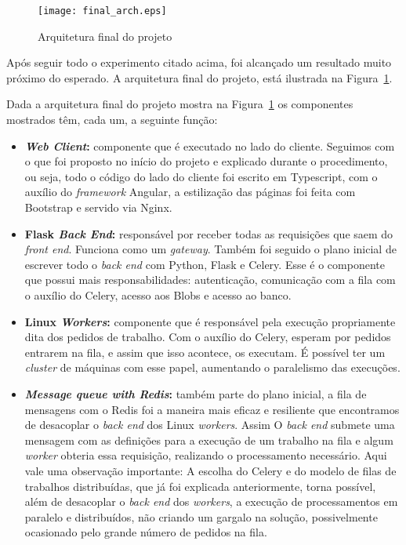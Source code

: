 \documentclass[11pt,twoside]{article}
\begin{document}
\begin{figure}[!h]
  \centering
  \texttt{[image: final\_arch.eps]}
  \caption{Arquitetura final do projeto}
  \label{fig:finalArch}
\end{figure}

Após seguir todo o experimento citado acima, foi alcançado um resultado muito próximo do esperado. A arquitetura final do projeto, está ilustrada na Figura~\ref{fig:finalArch}.

Dada a arquitetura final do projeto mostra na Figura~\ref{fig:finalArch} os componentes mostrados têm, cada um, a seguinte função:

\begin{itemize}
  \item \textbf{\emph{Web Client}:} componente que é executado no lado do cliente. Seguimos com o que foi proposto no início do projeto e explicado durante o procedimento, ou seja, todo o código do lado do cliente 
  foi escrito em Typescript, com o auxílio do \emph{framework} Angular, a estilização das páginas foi feita com Bootstrap e servido via Nginx.
  \item \textbf{Flask \emph{Back End}:} responsável por receber todas as requisições que saem do \emph{front end}. Funciona como um \emph{gateway}. Também foi seguido o plano inicial de escrever todo o \emph{back end} com
  Python, Flask e Celery. Esse é o componente que possui mais responsabilidades: autenticação, comunicação com a fila com o auxílio do Celery, acesso aos Blobs e acesso ao banco.
  \item \textbf{Linux \emph{Workers}:} componente que é responsável pela execução propriamente dita dos pedidos de trabalho. Com o auxílio do Celery, esperam por pedidos entrarem na fila, e assim que isso acontece, os executam. 
  É possível ter um \emph{cluster} de máquinas com esse papel, aumentando o paralelismo das execuções.
  \item \textbf{\emph{Message queue with Redis}:} também parte do plano inicial, a fila de mensagens com o Redis foi a maneira mais eficaz e resiliente que encontramos de desacoplar o \emph{back end} dos Linux \emph{workers}. Assim
  O \emph{back end} submete uma mensagem com as definições para a execução de um trabalho na fila e algum \emph{worker} obteria essa requisição, realizando o processamento necessário. Aqui vale uma observação 
  importante: A escolha do Celery e do modelo de filas de trabalhos distribuídas, que já foi explicada anteriormente, torna possível, além de desacoplar o \emph{back end} dos \emph{workers}, a execução de
  processamentos em paralelo e distribuídos, não criando um gargalo na solução, possivelmente ocasionado pelo grande número de pedidos na fila.
  

\end{itemize}
\end{document}
